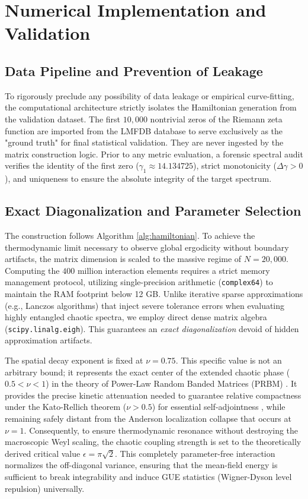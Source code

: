 \documentclass[prl,aps,floatfix,superscriptaddress,10pt]{revtex4-2}
\begin{document}
\section{Numerical Implementation and Validation}

\subsection{Data Pipeline and Prevention of Leakage}
To rigorously preclude any possibility of data leakage or empirical curve-fitting, the computational architecture strictly isolates the Hamiltonian generation from the validation dataset. The first $10,000$ nontrivial zeros of the Riemann zeta function are imported from the LMFDB database \cite{LMFDB} to serve exclusively as the "ground truth" for final statistical validation. They are never ingested by the matrix construction logic. Prior to any metric evaluation, a forensic spectral audit verifies the identity of the first zero ($\gamma_1 \approx 14.134725$), strict monotonicity ($\Delta \gamma > 0$), and uniqueness to ensure the absolute integrity of the target spectrum.

\subsection{Exact Diagonalization and Parameter Selection}
The construction follows Algorithm \ref{alg:hamiltonian}. To achieve the thermodynamic limit necessary to observe global ergodicity without boundary artifacts, the matrix dimension is scaled to the massive regime of $N=20,000$. Computing the $400$ million interaction elements requires a strict memory management protocol, utilizing single-precision arithmetic (\texttt{complex64}) to maintain the RAM footprint below 12 GB.
Unlike iterative sparse approximations (e.g., Lanczos algorithms) that inject severe tolerance errors when evaluating highly entangled chaotic spectra, we employ direct dense matrix algebra (\texttt{scipy.linalg.eigh}). This guarantees an \textit{exact diagonalization} devoid of hidden approximation artifacts.

The spatial decay exponent is fixed at $\nu = 0.75$. This specific value is not an arbitrary bound; it represents the exact center of the extended chaotic phase ($0.5 < \nu < 1$) in the theory of Power-Law Random Banded Matrices (PRBM) \cite{Mirlin1996}. It provides the precise kinetic attenuation needed to guarantee relative compactness under the Kato-Rellich theorem ($\nu > 0.5$) for essential self-adjointness \cite{ReedSimon1975}, while remaining safely distant from the Anderson localization collapse that occurs at $\nu = 1$. Consequently, to ensure thermodynamic resonance without destroying the macroscopic Weyl scaling, the chaotic coupling strength is set to the theoretically derived critical value $\epsilon = \pi \sqrt{2}$. This completely parameter-free interaction normalizes the off-diagonal variance, ensuring that the mean-field energy is sufficient to break integrability and induce GUE statistics (Wigner-Dyson level repulsion) universally.
\end{document}
